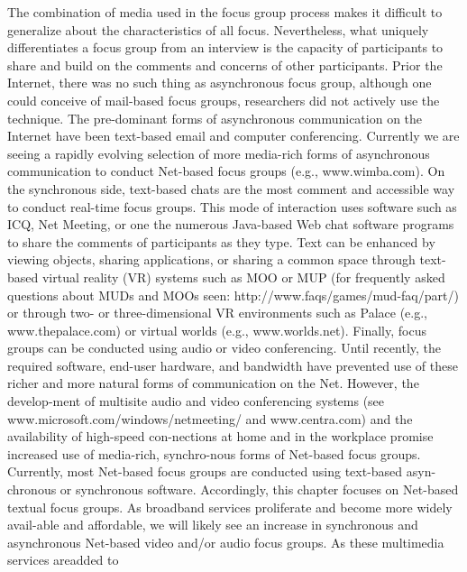 \documentclass{book}
\begin{document}
\vspace*{0.5cm}
\hspace*{0.5cm} The combination of media used in the focus group process makes it difficult to generalize about the characteristics of all focus. Nevertheless, what uniquely differentiates a focus group from an interview is the capacity of participants to share and build on the comments and concerns of other participants. Prior the Internet, there was no such thing as asynchronous focus group, although one could conceive of mail-based focus groups, researchers did not actively use the technique. The pre-dominant forms of asynchronous communication on the Internet have been text-based email and computer conferencing. Currently we are seeing a rapidly evolving selection of more media-rich forms of asynchronous communication to conduct Net-based focus groups (e.g., www.wimba.com). On the synchronous side, text-based chats are the most comment and accessible way to conduct real-time focus groups. This mode of interaction uses software such as ICQ, Net Meeting, or one the numerous Java-based Web chat software programs to share the comments of participants as they type. Text can be enhanced by viewing objects, sharing applications, or sharing a common space through text-based virtual reality (VR) systems such as MOO or MUP (for frequently asked questions about MUDs and MOOs seen: http://www.faqs/games/mud-faq/part/) or through two- or three-dimensional VR environments such as Palace (e.g., www.thepalace.com) or virtual worlds (e.g., www.worlds.net). Finally, focus groups can be conducted using audio or video conferencing. Until recently, the required software, end-user hardware, and bandwidth have prevented use of these richer and more natural forms of communication on the Net. However, the develop-ment of multisite audio and video conferencing systems (see www.microsoft.com/windows/netmeeting/ and www.centra.com) and the availability of high-speed con-nections at home and in the workplace promise increased use of media-rich, synchro-nous forms of Net-based focus groups.\\
\hspace*{0.5cm} Currently, most Net-based focus groups are conducted using text-based asyn-chronous or synchronous software. Accordingly, this chapter focuses on Net-based textual focus groups. As broadband services proliferate and become more widely avail-able and affordable, we will likely see an increase in synchronous and asynchronous Net-based video and/or audio focus groups. As these multimedia services areadded to\\
\end{document}
